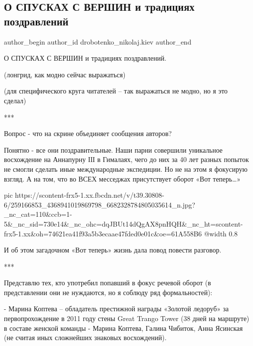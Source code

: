  
 
 
 
 
 
\subsection{О СПУСКАХ С ВЕРШИН и традициях поздравлений}
\label{sec:20_11_2021.fb.drobotenko_nikolaj.kiev.1.spuski_pozdravlenia}
 
\ifcmt
 author_begin
   author_id drobotenko_nikolaj.kiev
 author_end
\fi

О СПУСКАХ С ВЕРШИН и традициях поздравлений.

(лонгрид, как модно сейчас выражаться)

(для специфического круга читателей – так выражаться не модно, но я это сделал)

***

Вопрос - что на скрине объединяет сообщения авторов?

Понятно - все они поздравительные. Наши парни совершили уникальное восхождение
на Аннапурну ІІІ в Гималаях, чего до них за 40 лет разных попыток не смогли
сделать иные международные экспедиции. Но не на этом я фокусирую взгляд. А на
том, что во ВСЕХ месседжах присутствует оборот «Вот теперь…»

\ifcmt
  pic https://scontent-frx5-1.xx.fbcdn.net/v/t39.30808-6/259166853_4368941019869798_6682328784805035614_n.jpg?_nc_cat=110&ccb=1-5&_nc_sid=730e14&_nc_ohc=dqJBUt14dQgAX8pnHQH&_nc_ht=scontent-frx5-1.xx&oh=74621ea41f93a5b3ecaae47fded0e01c&oe=61A558B6
  @width 0.8
\fi

И об этом загадочном «Вот теперь» жизнь дала повод повести разговор.

***

Представлю тех, кто употребил попавший в фокус речевой оборот (в представлении
они не нуждаются, но я соблюду ряд формальностей):

- Марина Коптева – обладатель престижной награды «Золотой ледоруб» за
первопрохождение в 2011 году стены Great Trango Tower (38 дней на маршруте) в
составе женской команды - Марина Коптева, Галина Чибиток, Анна Ясинская (не
считая иных сложнейших знаковых восхождений).

